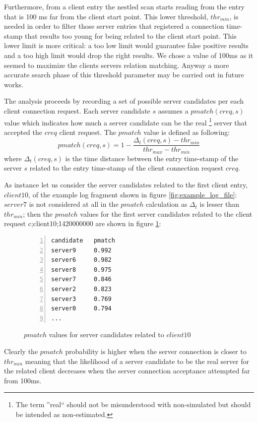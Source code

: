 Furthermore, from a client
entry the nestled scan starts reading from the entry that is 100 ms far
from the client start point. This lower threshold, $thr_{min}$, is needed in order to
 filter those server entries that registered a connection time-stamp
that results too young for being related to the client start point. This
lower limit is more critical: a too low limit would guarantee false
positive results and a too high limit would drop the right results.
We chose a value of 100ms as it seemed to maximize 
the clients servers relation matching. Anyway a more accurate search
phase of this threshold parameter may be carried out in future works.

The analysis proceeds by recording a set of possible server candidates 
 per each client connection request. Each server candidate $s$ assumes a
$pmatch(creq,s)$ value which
indicates how much a server candidate can be the real
\footnote{The term ''real`` should not be misunderstood with
non-simulated but should be intended as non-estimated.}
 server that
accepted the $creq$
client request. The $pmatch$ value is defined
as following:
\begin{equation}
pmatch(creq, s) = 1 - \frac{\Delta_t(creq, s) - thr_{min}}{thr_{max} - thr_{min}}
\end{equation}
where $\Delta_t(creq, s)$ is the time distance between the entry
time-stamp of the server $s$ related to the entry time-stamp of the client connection request
$creq$.

As instance let us consider the server candidates related to the first
client entry, $client10$, of the example log
fragment shown in figure \ref{fig:example_log_file}: 
$server7$ is not considered at all in the $pmatch$ calculation  as
$\Delta_t$ 
is lesser than $thr_{min}$; then the $pmatch$ values for the first server
candidates related to the client request c;client10;1420000000 are shown in figure \ref{fig:pmatch}:
\begin{figure}[h]
\begin{lstlisting}[language=bash,frame=single, numbers=left]
candidate 	pmatch
server9 	0.992
server6 	0.982
server8 	0.975
server7  	0.846
server2  	0.823 
server3  	0.769
server0  	0.794
...
\end{lstlisting}
\caption{$pmatch$ values for server candidates related to $client10$}
\label{fig:pmatch}
\end{figure}

Clearly the $pmatch$ probability is higher when the server connection is
closer to $thr_{min}$ meaning that the likelihood of a server
candidate to be the real server for the related client decreases when
the server connection acceptance attempted far from 100ms. 

